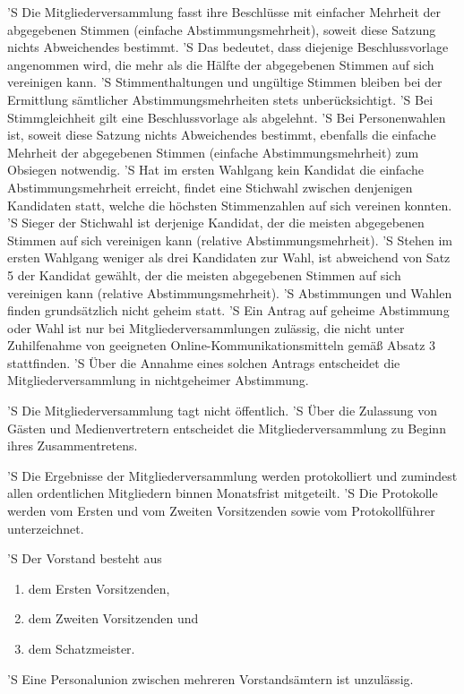 \documentclass[a4paper,10pt]{scrreprt}
\begin{document}
\begin{contract}
'S Die Mitgliederversammlung fasst ihre Beschlüsse mit einfacher Mehrheit der
abgegebenen Stimmen (einfache Abstimmungsmehrheit), soweit diese Satzung nichts
Abweichendes bestimmt.
'S Das bedeutet, dass diejenige Beschlussvorlage angenommen wird, die mehr als
die Hälfte der abgegebenen Stimmen auf sich vereinigen kann.
'S Stimmenthaltungen und ungültige Stimmen bleiben bei der Ermittlung
sämtlicher Abstimmungsmehrheiten stets unberücksichtigt.
'S Bei Stimmgleichheit gilt eine Beschlussvorlage als abgelehnt.
'S Bei Personenwahlen ist, soweit diese Satzung nichts Abweichendes bestimmt,
ebenfalls die einfache Mehrheit der abgegebenen Stimmen (einfache
Abstimmungsmehrheit) zum Obsiegen notwendig.
'S Hat im ersten Wahlgang kein Kandidat die einfache Abstimmungsmehrheit
erreicht, findet eine Stichwahl zwischen denjenigen Kandidaten statt, welche
die höchsten Stimmenzahlen auf sich vereinen konnten.
'S Sieger der Stichwahl ist derjenige Kandidat, der die meisten abgegebenen
Stimmen auf sich vereinigen kann (relative Abstimmungsmehrheit).
'S Stehen im ersten Wahlgang weniger als drei Kandidaten zur Wahl, ist
abweichend von Satz 5 der Kandidat gewählt, der die meisten abgegebenen Stimmen
auf sich vereinigen kann (relative Abstimmungsmehrheit).
'S Abstimmungen und Wahlen finden grundsätzlich nicht geheim statt.
'S Ein Antrag auf geheime Abstimmung oder Wahl ist nur bei
Mitgliederversammlungen zulässig, die nicht unter Zuhilfenahme von geeigneten
Online-Kommunikationsmitteln gemäß Absatz 3 stattfinden.
'S Über die Annahme eines solchen Antrags entscheidet die Mitgliederversammlung
in nichtgeheimer Abstimmung.

'S Die Mitgliederversammlung tagt nicht öffentlich.
'S Über die Zulassung von Gästen und Medienvertretern entscheidet die
Mitgliederversammlung zu Beginn ihres Zusammentretens.

'S Die Ergebnisse der Mitgliederversammlung werden protokolliert und zumindest
allen ordentlichen Mitgliedern binnen Monatsfrist mitgeteilt.
'S Die Protokolle werden vom Ersten und vom Zweiten Vorsitzenden sowie vom
Protokollführer unterzeichnet.


'S Der Vorstand besteht aus
\begin{enumerate}
	\item dem Ersten Vorsitzenden,
	\item dem Zweiten Vorsitzenden und
	\item dem Schatzmeister.
\end{enumerate}
'S Eine Personalunion zwischen mehreren Vorstandsämtern ist unzulässig.


\end{contract}
\end{document}
